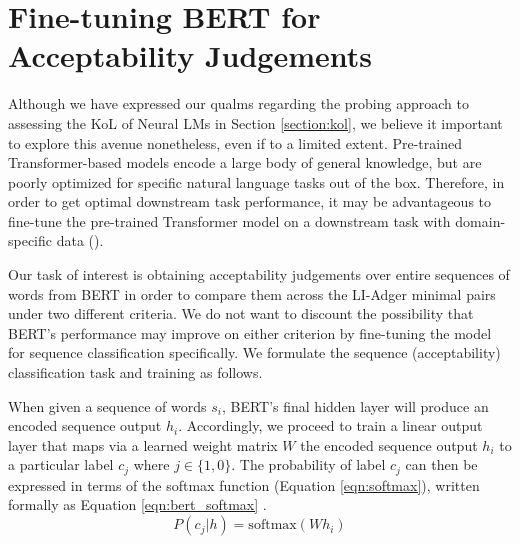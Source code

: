 \chapter{Fine-tuning BERT for Acceptability Judgements}
\label{chapter:chapter2}

Although we have expressed our qualms regarding the probing approach to assessing the KoL of Neural LMs in Section \ref{section:kol}, we believe it important to explore this avenue nonetheless, even if to a limited extent.  Pre-trained Transformer-based models encode a large body of general knowledge, but are poorly optimized for specific natural language tasks out of the box.  Therefore, in order to get optimal downstream task performance, it may be advantageous to fine-tune the pre-trained Transformer model on a downstream task with domain-specific data (\citealp{radford2018improving,devlin2018bert}).

Our task of interest is obtaining acceptability judgements over entire sequences of words from BERT in order to compare them across the LI-Adger minimal pairs under two different criteria.  We do not want to discount the possibility that BERT's performance may improve on either criterion by fine-tuning the model for sequence classification specifically.  We formulate the sequence (acceptability) classification task and training as follows.

When given a sequence of words $s_i$, BERT's final hidden layer will produce an encoded sequence output $h_i$.  Accordingly, we proceed to train a linear output layer that maps via a learned weight matrix $W$ the encoded sequence output $h_i$ to a particular label $c_j$ where $ j \in \{1,0\}$.  The probability of label $c_j$ can then be expressed in terms of the softmax function (Equation \ref{eqn:softmax}), written formally as Equation \ref{eqn:bert_softmax} \citep{sun2019}.
\begin{equation}
    \label{eqn:bert_softmax}
    P(c_j|h) = \mathrm{softmax}(Wh_i)
\end{equation}

